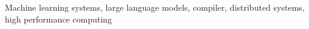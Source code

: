 \documentclass[11pt, a4paper]{awesome-cv}
\begin{document}
\makecvheader






\small{Machine learning systems, large language models, compiler, distributed systems, high performance computing}




\clearpage




%
%
%
%
%

\end{document}
